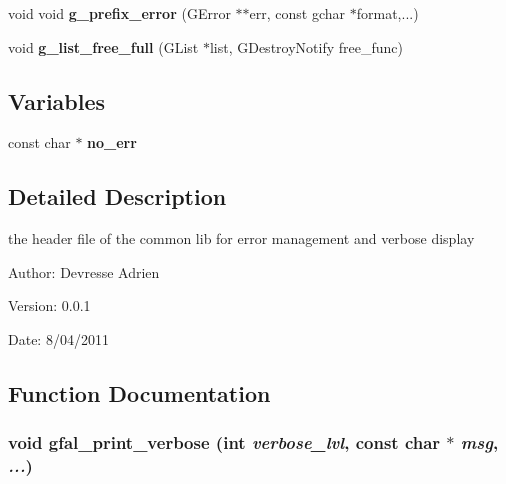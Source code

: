 \begin{CompactItemize}
\item 
void void \textbf{g\_\-prefix\_\-error} (GError $\ast$$\ast$err, const gchar $\ast$format,...)\label{gfal__common__errverbose_8h_e78cdd895b743d7b44904377b3f4c4ee}

\item 
void \textbf{g\_\-list\_\-free\_\-full} (GList $\ast$list, GDestroy\-Notify free\_\-func)\label{gfal__common__errverbose_8h_0d507092f75c2411862d210dbecbc4e5}

\end{CompactItemize}
\subsection*{Variables}
\begin{CompactItemize}
\item 
const char $\ast$ \textbf{no\_\-err}\label{gfal__common__errverbose_8h_cc06ff0911bcca4df46746f73337cab2}

\end{CompactItemize}


\subsection{Detailed Description}
the header file of the common lib for error management and verbose display 

\begin{Desc}
\item[Author:]Devresse Adrien \end{Desc}
\begin{Desc}
\item[Version:]0.0.1 \end{Desc}
\begin{Desc}
\item[Date:]8/04/2011 \end{Desc}


\subsection{Function Documentation}
\subsubsection{\setlength{\rightskip}{0pt plus 5cm}void gfal\_\-print\_\-verbose (int {\em verbose\_\-lvl}, const char $\ast$ {\em msg},  {\em ...})}\label{gfal__common__errverbose_8h_8b05640b4b43a776603bd93703c29d30}



